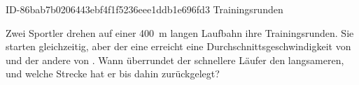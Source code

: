 \begin{exercise}
      {ID-86bab7b0206443ebf4f1f5236eee1ddb1e696fd3}
      {Trainingsrunden}
  \ifproblem\problem\par
    Zwei Sportler drehen auf einer \SI{400}{\metre} langen Laufbahn ihre
    Trainingsrunden. Sie starten gleichzeitig, aber der eine erreicht eine
    Durchschnittsgeschwindigkeit von  und der andere von .
    Wann überrundet der schnellere Läufer den langsameren, und welche
    Strecke hat er bis dahin zurückgelegt?
  \fi
\end{exercise}
